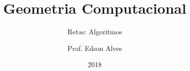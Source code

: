 \title{Geometria Computacional}
\subtitle{Retas: Algoritmos}
\date{2018}
\author{Prof. Edson Alves}
